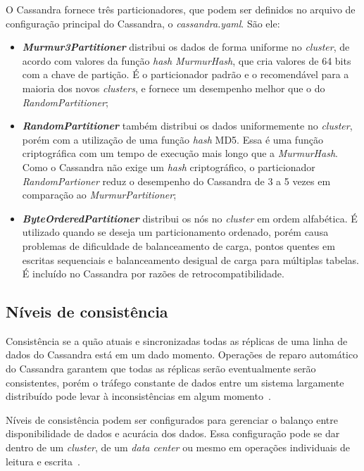 O Cassandra fornece três particionadores, que podem ser definidos no arquivo de configuração principal do Cassandra, o \emph{cassandra.yaml}. São ele:

\begin{itemize}
\item \textbf{\emph{Murmur3Partitioner}} distribui os dados de forma uniforme no \emph{cluster}, de acordo com valores da função \emph{hash} \emph{MurmurHash}, que cria valores de 64 bits com a chave de partição. É o particionador padrão e o recomendável para a maioria dos novos \emph{clusters}, e fornece um desempenho melhor que o do \emph{RandomPartitioner};

\item \textbf{\emph{RandomPartitioner}} também distribui os dados uniformemente no \emph{cluster}, porém com a utilização de uma função \emph{hash} MD5. Essa é uma função criptográfica com um tempo de execução mais longo que a \emph{MurmurHash}. Como o Cassandra não exige um \emph{hash} criptográfico, o particionador \emph{RandomPartioner} reduz o desempenho do Cassandra de 3 a 5 vezes em comparação ao \emph{MurmurPartitioner};

\item \textbf{\emph{ByteOrderedPartitioner}} distribui os nós no \emph{cluster} em ordem alfabética. É utilizado quando se deseja um particionamento ordenado, porém causa problemas de dificuldade de balanceamento de carga, pontos quentes em escritas sequenciais e balanceamento desigual de carga para múltiplas tabelas. É incluído no Cassandra por razões de retrocompatibilidade.
\end{itemize}

\subsection*{Níveis de consistência}

Consistência se a quão atuais e sincronizadas todas as réplicas de uma linha de dados do Cassandra está em um dado momento. Operações de reparo automático do Cassandra garantem que todas as réplicas serão eventualmente serão consistentes, porém o tráfego constante de dados entre um sistema largamente distribuído pode levar à inconsistências em algum momento~\cite{cassandradocs}.

Níveis de consistência podem ser configurados para gerenciar o balanço entre disponibilidade de dados e acurácia dos dados. Essa configuração pode se dar dentro de um \emph{cluster}, de um \emph{data center} ou mesmo em operações individuais de leitura e escrita~\cite{cassandradocs}.

